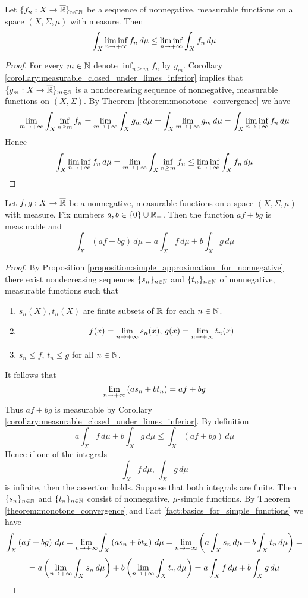 \begin{theorem}\label{theorem:fatous_lemma}
Let $\{f_n:X\rightarrow \overline{{\mathbb R}}\}_{n\in {\mathbb N}}$ be a sequence of nonnegative, measurable functions on a space $(X,\Sigma,\mu)$ with measure. Then
$$\int_X\liminf_{n\rightarrow +\infty}f_n\,d\mu \leq \liminf_{n\rightarrow +\infty}\int_Xf_n\,d\mu$$
\end{theorem}
\begin{proof}
For every $m\in {\mathbb N}$ denote $\inf_{n\geq m}f_n$ by $g_m$. Corollary \ref{corollary:measurable_closed_under_limes_inferior} implies that $\{g_m:X\rightarrow \overline{{\mathbb R}}\}_{m\in {\mathbb N}}$ is a nondecreasing sequence of nonnegative, measurable functions on $(X,\Sigma)$. By Theorem \ref{theorem:monotone_convergence} we have
$$\lim_{m\rightarrow +\infty}\int_X\inf_{n\geq m}f_n = \lim_{m\rightarrow +\infty}\int_Xg_m\,d\mu = \int_X\lim_{m\rightarrow +\infty}g_m\,d\mu = \int_X\liminf_{n\rightarrow +\infty}f_n\,d\mu$$
Hence
$$\int_X\liminf_{n\rightarrow +\infty}f_n\,d\mu = \lim_{m\rightarrow +\infty}\int_X\inf_{n\geq m}f_n \leq \liminf_{n\rightarrow +\infty}\int_Xf_n\,d\mu$$
\end{proof}

\begin{proposition}\label{proposition:integral_is_linear}
Let $f,g:X\rightarrow \overline{{\mathbb R}}$ be a nonnegative, measurable functions on a space $(X,\Sigma,\mu)$ with measure. Fix numbers $a, b\in \{0\}\cup {\mathbb R}_+$. Then the function $a f+b  g$ is measurable and 
$$\int_X\left(a f+b  g\right)\,d\mu = a \int_Xf\,d\mu + b \int_Xg\,d\mu$$
\end{proposition}
\begin{proof}
By Proposition \ref{proposition:simple_approximation_for_nonnegative} there exist nondecreasing sequences $\{s_n\}_{n\in {\mathbb N}}$ and $\{t_n\}_{n\in {\mathbb N}}$ of nonnegative, measurable functions such that
\begin{enumerate}[label=\textbf{(\arabic*)}, leftmargin=*]
\item $s_n(X),t_n(X)$ are finite subsets of ${\mathbb R}$ for each $n\in {\mathbb N}$. 
\item $$f(x) = \lim_{n\rightarrow +\infty}s_n(x),\,g(x) = \lim_{n\rightarrow +\infty}t_n(x)$$
\item $s_n \leq f,\,t_n\leq g$ for all $n \in {\mathbb N}$.
\end{enumerate} 
It follows that
$$\lim_{n \rightarrow +\infty}\left(as_n + bt_n\right) = af + bg$$
Thus $af+bg$ is measurable by Corollary \ref{corollary:measurable_closed_under_limes_inferior}.
By definition
$$a \int_Xf\,d\mu + b \int_Xg\,d\mu \leq \int_X\left(a f+b  g\right)\,d\mu $$
Hence if one of the integrals
$$\int_Xf\,d\mu,\,\int_Xg\,d\mu$$
is infinite, then the assertion holds. Suppose that both integrals are finite. Then $\{s_n\}_{n\in {\mathbb N}}$ and $\{t_n\}_{n\in {\mathbb N}}$ consist of nonnegative, $\mu$-simple functions. By Theorem \ref{theorem:monotone_convergence} and Fact \ref{fact:basics_for_simple_functions} we have
$$\int_X\left(a f + b g\right)\,d\mu = \lim_{n\rightarrow +\infty}\int_X\left(a s_n + b t_n\right)\,d\mu = \lim_{n\rightarrow +\infty}\left(a \int_Xs_n\,d\mu + b \int_Xt_n\,d\mu\right) =$$
$$=a  \left(\lim_{n\rightarrow +\infty}\int_Xs_n\,d\mu\right) + b \left(\lim_{n\rightarrow +\infty}\int_Xt_n\,d\mu\right) = a \int_Xf\,d\mu + b \int_Xg\,d\mu$$
\end{proof}

